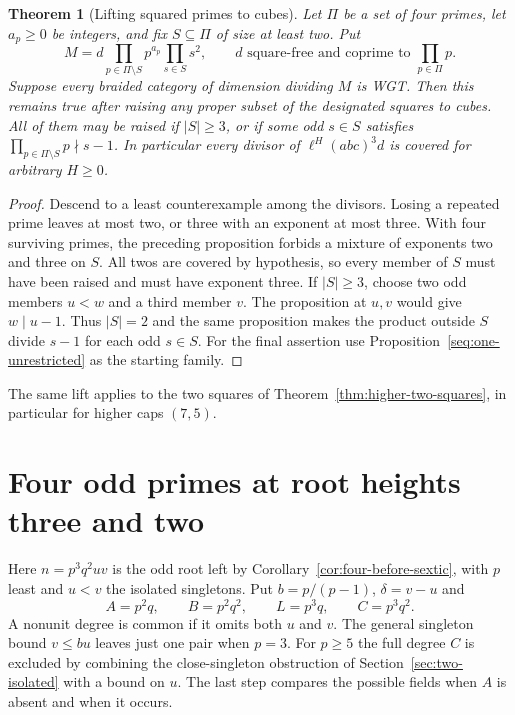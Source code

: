 \documentclass[11pt,a4paper]{article}
\numberwithin{equation}{section}
\newtheorem{theorem}{Theorem}[section]
\theoremstyle{remark}
\begin{document}
\begin{theorem}[Lifting squared primes to cubes]\label{fam:M:10.3}\label{thm:cubic-lift}\label{thm:four-cubics}\label{cor:four-at-most-three}
Let $\Pi$ be a set of four primes, let $a_p\ge0$ be integers, and fix $S\subseteq\Pi$ of size at least
two. Put
\[
 M=d\prod_{p\in\Pi\setminus S}p^{a_p}\prod_{s\in S}s^2,
 \qquad d\text{ square-free and coprime to }\prod_{p\in\Pi}p .
\]
Suppose every braided category of dimension dividing $M$ is WGT.
Then this remains true after raising any proper subset of the
designated squares to cubes. All of them may be raised if $|S|\ge3$,
or if some odd $s\in S$ satisfies
$\prod_{p\in\Pi\setminus S}p\nmid s-1$.
In particular every divisor of $\ell^H(abc)^3d$ is covered for
arbitrary $H\ge0$.
\end{theorem}
\begin{proof}
Descend to a least counterexample among the divisors. Losing a repeated
prime leaves at most two, or three with an exponent at most three.
With four surviving primes, the preceding proposition forbids a mixture
of exponents two and three on $S$. All twos are covered by hypothesis,
so every member of $S$ must have been raised and must have exponent three. If $|S|\ge3$,
choose two odd members $u<w$ and a third member $v$. The proposition
at $u,v$ would give $w\mid u-1$. Thus $|S|=2$ and the same proposition makes the product outside
$S$ divide $s-1$ for each odd $s\in S$. For the final assertion use
Proposition~\ref{seq:one-unrestricted} as the starting family.
\end{proof}
The same lift applies to the two squares of
Theorem~\ref{thm:higher-two-squares}, in particular for higher caps
$(7,5)$.

\section{Four odd primes at root heights three and two}\label{fam:M:sec:12}\label{subsec:four-sextic}
Here $n=p^3q^2uv$ is the odd root left by
Corollary~\ref{cor:four-before-sextic}, with $p$ least and $u<v$
the isolated singletons. Put $b=p/(p-1)$, $\delta=v-u$ and
\[
 A=p^2q,\qquad B=p^2q^2,\qquad L=p^3q,\qquad C=p^3q^2.
\]
A nonunit degree is common if it omits both $u$ and $v$.
The general singleton bound $v\le bu$ leaves just one pair when $p=3$.
For $p\ge5$ the full degree $C$ is excluded
by combining the close-singleton obstruction of Section~\ref{sec:two-isolated} with a bound on $u$. The last step
compares the possible fields when $A$ is absent and when it occurs.
\end{document}
